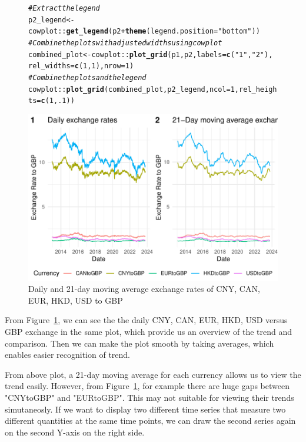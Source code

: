 \documentclass{article}\usepackage[]{graphicx}\usepackage[]{xcolor}
\makeatletter
\def\maxwidth{ %
  \ifdim\Gin@nat@width>\linewidth
    \linewidth
  \else
    \Gin@nat@width
  \fi
}
\newcommand{\hlnum}[1]{\textcolor[rgb]{0.686,0.059,0.569}{#1}}%
\newcommand{\hlstr}[1]{\textcolor[rgb]{0.192,0.494,0.8}{#1}}%
\newcommand{\hlcom}[1]{\textcolor[rgb]{0.678,0.584,0.686}{\textit{#1}}}%
\newcommand{\hlopt}[1]{\textcolor[rgb]{0,0,0}{#1}}%
\newcommand{\hlstd}[1]{\textcolor[rgb]{0.345,0.345,0.345}{#1}}%
\newcommand{\hlkwb}[1]{\textcolor[rgb]{0.69,0.353,0.396}{#1}}%
\newcommand{\hlkwc}[1]{\textcolor[rgb]{0.333,0.667,0.333}{#1}}%
\newcommand{\hlkwd}[1]{\textcolor[rgb]{0.737,0.353,0.396}{\textbf{#1}}}%
\newenvironment{kframe}{%
 \def\at@end@of@kframe{}%
 \ifinner\ifhmode%
  \def\at@end@of@kframe{\end{minipage}}%
  \begin{minipage}{\columnwidth}%
 \fi\fi%
 \def\FrameCommand##1{\hskip\@totalleftmargin \hskip-\fboxsep
 \colorbox{shadecolor}{##1}\hskip-\fboxsep
     \hskip-\linewidth \hskip-\@totalleftmargin \hskip\columnwidth}%
 \MakeFramed {\advance\hsize-\width
   \@totalleftmargin\z@ \linewidth\hsize
   \@setminipage}}%
 {\par\unskip\endMakeFramed%
 \at@end@of@kframe}
\newenvironment{knitrout}{}{} %
\makeatother
\begin{document}
\begin{figure}
\begin{knitrout}
\begin{kframe}
\begin{alltt}
\hlcom{# Extract the legend}
\hlstd{p2_legend} \hlkwb{<-} \hlstd{cowplot}\hlopt{::}\hlkwd{get_legend}\hlstd{(p2} \hlopt{+} \hlkwd{theme}\hlstd{(}\hlkwc{legend.position}\hlstd{=}\hlstr{"bottom"}\hlstd{))}
\hlcom{# Combine the plots with adjusted widths using cowplot}
\hlstd{combined_plot} \hlkwb{<-} \hlstd{cowplot}\hlopt{::}\hlkwd{plot_grid}\hlstd{(p1, p2,} \hlkwc{labels} \hlstd{=} \hlkwd{c}\hlstd{(}\hlstr{"1"}\hlstd{,} \hlstr{"2"}\hlstd{),}
                                    \hlkwc{rel_widths} \hlstd{=} \hlkwd{c}\hlstd{(}\hlnum{1}\hlstd{,} \hlnum{1}\hlstd{),} \hlkwc{nrow}\hlstd{=}\hlnum{1}\hlstd{)}
\hlcom{# Combine the plots and the legend}
\hlstd{cowplot}\hlopt{::}\hlkwd{plot_grid}\hlstd{(combined_plot, p2_legend,} \hlkwc{ncol}\hlstd{=}\hlnum{1}\hlstd{,} \hlkwc{rel_heights} \hlstd{=} \hlkwd{c}\hlstd{(}\hlnum{1}\hlstd{,} \hlnum{.1}\hlstd{))}
\end{alltt}
\end{kframe}
\includegraphics[width=\maxwidth]{figure/unnamed-chunk-2-1} 
\end{knitrout}
\caption{Daily and 21-day moving average exchange rates of CNY, CAN, EUR, HKD, USD to GBP}
\label{fig:all exchange rates}
\end{figure}

From Figure~\ref{fig:all exchange rates}, we can see the the daily CNY, CAN, EUR, HKD, USD versus GBP exchange in the same plot, which provide us an overview of the trend and comparison. Then we can make the plot smooth by taking averages, which enables easier recognition of trend.

From above plot, a 21-day moving average for each currency allows us to view the trend easily. However, from Figure~\ref{fig:all exchange rates}, for example there are huge gaps between "CNYtoGBP" and "EURtoGBP". This may not suitable for viewing their trends simutaneosly. If we want to display two different time series that measure two different quantities at the same time points, we can draw the second series again on the second Y-axis on the right side.
\end{document}
